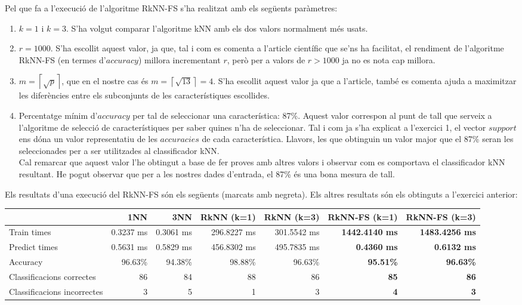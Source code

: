 \documentclass{article} %
\begin{document}
{	Pel que fa a l'execució de l'algoritme RkNN-FS s'ha realitzat amb els següents paràmetres:
	\begin{enumerate}
		\item $k = 1$ i $k = 3$. S'ha volgut comparar l'algoritme kNN amb els dos valors normalment més usats.
		\item $r = 1000$. S'ha escollit aquest valor, ja que, tal i com es comenta a l'article científic que se'ns ha facilitat, el rendiment de l'algoritme RkNN-FS (en termes d'$accuracy$) millora incrementant $r$, però per a valors de $r > 1000$ ja no es nota cap millora.
		\item $m = \left \lceil{\sqrt{p}}\right \rceil$, que en el nostre cas és $m = \left \lceil{\sqrt{13}}\right \rceil = 4$. S'ha escollit aquest valor ja que a l'article, també es comenta ajuda a maximitzar les diferències entre els subconjunts de les característiques escollides.
		\item {
			Percentatge mínim d'$accuracy$ per tal de seleccionar una característica: 87\%. Aquest valor correspon al punt de tall que serveix a l'algoritme de selecció de característiques per saber quines n'ha de seleccionar. Tal i com ja s'ha explicat a l'exercici 1, el vector $support$ ens dóna un valor representatiu de les $accuracies$ de cada característica. Llavors, les que obtinguin un valor major que el 87\% seran les seleccionades per a ser utilitzades al classificador kNN. \\
			Cal remarcar que aquest valor l'he obtingut a base de fer proves amb altres valors i observar com es comportava el classificador kNN resultant. He pogut observar que per a les nostres dades d'entrada, el 87\% és una bona mesura de tall.
		}
	\end{enumerate}

	Els resultats d'una execució del RkNN-FS són els següents (marcats amb negreta). Els altres resultats són els obtinguts a l'exercici anterior:

	\begin{changemargin}{-4cm}{0.5cm}
	{\selectfont\small
	\begin{tabular}{l | r r r r r r}
		& 1NN & 3NN & RkNN (k=1) & RkNN (k=3) & \textbf{RkNN-FS (k=1)} & \textbf{RkNN-FS (k=3)} \\ \hline
		Train times 				& 0.3237 ms & 0.3061 ms & 296.8227 ms 	& 301.5542 ms & \textbf{1442.4140 ms} & \textbf{1483.4256 ms} \\
		Predict times 				& 0.5631 ms & 0.5829 ms & 456.8302 ms 	& 495.7835 ms & \textbf{0.4360 ms}	 & \textbf{0.6132 ms} \\
		Accuracy 					& 96.63\% 	& 94.38\%	& 98.88\% 		& 96.63\%	  & \textbf{95.51\%}	 & \textbf{96.63\%} \\
		Classificacions correctes 	& 86 		& 84		& 88			& 86		  & \textbf{85}			 & \textbf{86} \\
		Classificacions incorrectes & 3 		& 5 		& 1				& 3			  & \textbf{4}			 & \textbf{3} \\
	\end{tabular}
	}
	\end{changemargin}

}
\end{document}
